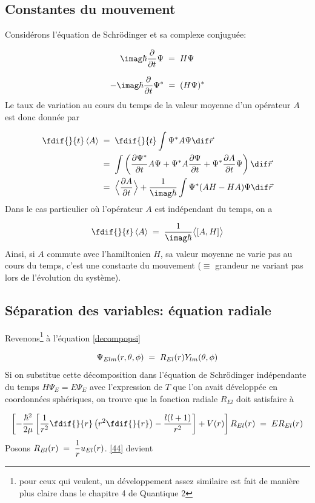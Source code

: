\subsection{Constantes du mouvement}
Considérons l'équation de Schrödinger et sa complexe conjuguée:

\[
    \imag \hbar \dfrac{\partial}{\partial t} \Psi \eq H \Psi
\]

\[
    -\imag \hbar \dfrac{\partial}{\partial t} \Psi ^{*}\eq (H \Psi)^{*}
\]
Le taux de variation au cours du temps de la valeur moyenne d'un opérateur $A$ est donc donnée par

\begin{align*}
    \fdif{}{t}  \braket{A} &\eq\fdif{}{t} \int \Psi^{*} A \Psi \dif\vec{r} \\
    &\eq \int\left(\dfrac{\partial\Psi^{*}}{\partial t}A \Psi + \Psi^{*} A \dfrac{\partial \Psi }{\partial t } + \Psi^{*} \dfrac{\partial A}{\partial t}\Psi \right) \dif\vec{r}\\
    &\eq \Big< \dfrac{\partial A}{\partial t} \Big> +\dfrac{1}{\imag \hbar} \int \Psi^{*} (AH-HA)\Psi \dif\vec{r}
\end{align*}
Dans le cas particulier où l'opérateur $A$ est indépendant du temps, on a


\[
  \fdif{}{t}\left<A\right>\eq \dfrac{1}{\imag\hbar}\big<[A,H]\big>
\]
Ainsi, si $A$ commute avec l'hamiltonien $H$, sa valeur moyenne ne varie pas au cours du temps, c'est une constante du mouvement ($\equiv$ grandeur ne variant pas lors de l'évolution du système).


\subsection{Séparation des variables: équation radiale}
Revenons\footnote{pour ceux qui veulent, un développement assez similaire est fait de
manière plus claire dans le chapitre 4 de Quantique 2} à l'équation \eqref{decompopsi}

\[
    \Psi_{Elm}(r, \theta, \phi)\; = \; R_{El}(r)Y_{lm}(\theta, \phi)
\]
Si on substitue cette décomposition dans l'équation de Schrödinger indépendante du temps $H\Psi_E=E\Psi_E$ avec l'expression de $T$ que l'on avait développée en coordonnées sphériques, on trouve que la fonction radiale $R_{El}$ doit satisfaire à

\begin{equation}
    \left[-\dfrac{\hbar^2}{2\mu}\left[\dfrac{1}{r^2}\fdif{}{r}\left(r^2\fdif{}{r}\right) - \dfrac{l(l+1)}{r^2}\right]+V(r)\right]R_{El}(r)\eq ER_{El}(r)
    \label{44}
\end{equation}
Posons $R_{El}(r)\; = \; \dfrac{1}{r}u_{El}(r)$. \eqref{44} devient

